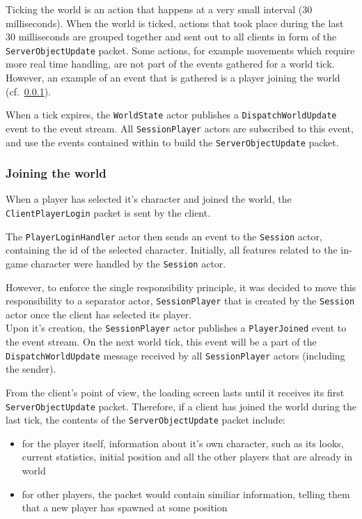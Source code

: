\documentclass[paper=a4, fontsize=11pt]{scrartcl}
\begin{document}
Ticking the world is an action that happens at a very small interval (30
milliseconds).
When the world is ticked, actions that took place during the last 30
milliseconds are grouped together and sent out to all clients in form of the
\texttt{ServerObjectUpdate} packet.
Some actions, for example movements which require more real time handling,
are not part of the events gathered for a world tick. However, an example of an
event that is gathered is a player joining the world (cf.~\ref{jtw}).

When a tick expires, the \texttt{WorldState} actor publishes a
\texttt{DispatchWorldUpdate} event to the event stream.
All \texttt{SessionPlayer} actors are subscribed to this event, and use the
events contained within to build the \texttt{ServerObjectUpdate} packet.

\subsubsection{Joining the world}\label{jtw}

When a player has selected it's character and joined the world, the
\texttt{ClientPlayerLogin} packet is sent by the client.

The \texttt{PlayerLoginHandler} actor then sends an event to the \texttt{Session}
actor, containing the id of the selected character.
Initially, all features related to the in-game character were handled by the
\texttt{Session} actor.

However, to enforce the single responsibility principle, it was decided to move
this responsibility to a separator actor, \texttt{SessionPlayer} that is created
by the \texttt{Session} actor once the client has selected its player.\\

Upon it's creation, the \texttt{SessionPlayer} actor publishes a
\texttt{PlayerJoined} event to the event stream.  
On the next world tick, this event will be a part of the
\texttt{DispatchWorldUpdate} message received by all \texttt{SessionPlayer}
actors (including the sender).

From the client's point of view, the loading screen lasts until it receives its
first \texttt{ServerObjectUpdate} packet.
Therefore, if a client has joined the world during the last tick, the contents
of the \texttt{ServerObjectUpdate} packet include:
\begin{itemize}
    \item for the player itself, information about it's
        own character, such as its looks, current statistics, initial
        position and all the other players that are already in world
    \item for other players, the packet would contain similiar information,
        telling them that a new player has spawned at some position
\end{itemize}
\end{document}
